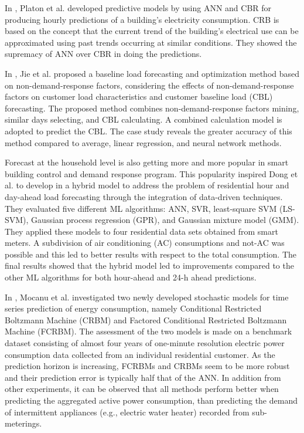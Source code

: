 In \cite{PLATON201510}, Platon et al. developed predictive models by using ANN and CBR for producing hourly predictions of a building’s electricity consumption.
CRB is based on the concept that the current trend of the building's electrical use can be approximated using past trends occurring at similar conditions.
They showed the supremacy of ANN over CBR in doing the predictions.

In \cite{7576207}, Jie et al. proposed a baseline load forecasting and optimization method based on non-demand-response factors, considering the effects of non-demand-response factors on customer load characteristics and customer baseline load (CBL) forecasting.
The proposed method combines non-demand-response factors mining, similar days selecting, and CBL calculating.
A combined calculation model is adopted to predict the CBL.
The case study reveals the greater accuracy of this method compared to average, linear regression, and neural network methods.

Forecast at the household level is also getting more and more popular in smart building control and demand response program.
This popularity inspired Dong et al. to develop in \cite{DONG2016341} a hybrid model to address the problem of residential hour and day-ahead load forecasting through the integration of data-driven techniques.
They evaluated five different ML algorithms: ANN, SVR, least-square SVM (LS-SVM), Gaussian process regression (GPR), and Gaussian mixture model (GMM).
They applied these models to four residential data sets obtained from smart meters.
A subdivision of air conditioning (AC) consumptions and not-AC was possible and this led to better results with respect to the total consumption.
The final results showed that the hybrid model led to improvements compared to the other ML algorithms for both hour-ahead and 24-h ahead predictions.

In \cite{MOCANU201691}, Mocanu et al. investigated two newly developed stochastic models for time series prediction of energy consumption, namely Conditional Restricted Boltzmann Machine (CRBM) and Factored Conditional Restricted Boltzmann Machine (FCRBM).
The assessment of the two models is made on a benchmark dataset consisting of almost four years of one-minute resolution electric power consumption data collected from an individual residential customer.
As the prediction horizon is increasing, FCRBMs and CRBMs seem to be more robust and their prediction error is typically half that of the ANN.
In addition from other experiments, it can be observed that all methods perform better when predicting the aggregated active power consumption, than predicting the demand of intermittent appliances (e.g., electric water heater) recorded from sub-meterings.

